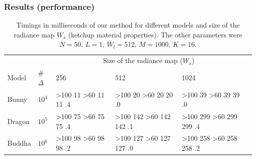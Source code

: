 \documentclass{beamer}
\newcommand\mycolor[1]{
\ifnum#1>100 \cellcolor{redcell}#1%
\else
\ifnum#1>60 \cellcolor{yellowcell}#1%
\else
\cellcolor{greencell}#1%
\fi
\fi
}%
\begin{document}
\begin{frame}
    \frametitle{Results (performance)}
		\renewcommand{\arraystretch}{1.8}
\begin{table}[!ht]
\centering
\begin{tabular}{p{3cm}l|l|l|l|l|}

\cline{3-5}
                             &      & \multicolumn{3}{c|}{Size of the radiance map ($W_s$)}                                          \\ \cline{3-5} 
Model                        & \#$\Delta$& \multicolumn{1}{p{1.2cm}|}{256} & \multicolumn{1}{p{1.2cm}|}{512} & \multicolumn{1}{p{1.2cm}|}{1024} \\ \hline
\multicolumn{1}{|l|}{Bunny}  & $10^4$ & \mycolor{11}.4                  & \mycolor{20}.0                 & \mycolor{39}.0                               \\ \hline
\multicolumn{1}{|l|}{Dragon} & $10^5$ & \mycolor{75}.4                 & \mycolor{142}.1                  & \mycolor{299}.4                             \\ \hline
\multicolumn{1}{|l|}{Buddha} & $10^6$ & \mycolor{98}.2                 & \mycolor{127}.0                  & \mycolor{258}.2                             \\ \hline
\end{tabular}
\caption{Timings in milliseconds of our method for different models and size of the radiance map $W_s$ (ketchup material properties). The other parameters were $N = 50$, $L = 1$, $W_l = 512$, $M = 1000$, $K =16$.}
\end{table}
\end{frame}
\end{document}
